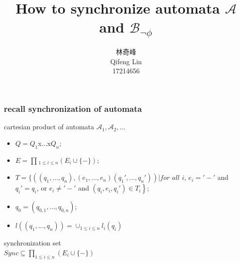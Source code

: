 \documentclass{beamer}
\begin{document}
    \begin{frame}
    \title{How to synchronize automata $\mathcal{A}$ and $\mathcal{B}_{\neg\phi}$}
    \author{林奇峰\\ Qifeng Lin \\ 17214656}
    \maketitle
    \end{frame}

    \begin{frame}
        \frametitle{recall synchronization of automata}
        cartesian product of automata $\mathcal{A}_1,\mathcal{A}_2,\dots$ \\
            \begin{itemize}
                \item $Q=Q_1$x...x$Q_n$;
                \item $E=\prod_{}{}_{1\leq i \leq n}(E_i\cup\{-\})$;
                \item $T=\left.\{ ((q_1,...,q_n),(e_1,\dots,e_n)(q_1',...,q_n')) |  for\right.$ $all$ $i$, $e_i='-'$ and $q_i'=q_i$, or $e_i\neq '-'$ and $(q_i,e_i,q_i')\in T_i \left.\right\} $;
                \item $q_0=(q_{0,1},...,q_{0,n})$;
                \item $l((q_1,...,q_n))=\cup _{1\leq i \leq n}l_i(q_i)$
            \end{itemize}

        synchronization set \\
            \quad $   Sync \subseteq \prod_{1\leq i \leq n}^{}(E_i\cup\{-\})$
    \end{frame}
\end{document}
